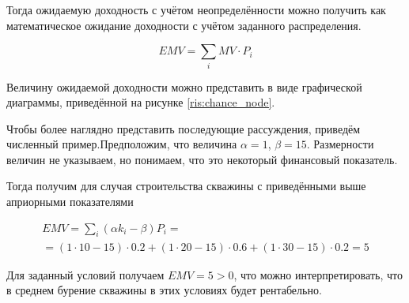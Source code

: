 Тогда ожидаемую доходность с учётом неопределённости можно получить как математическое ожидание доходности с учётом заданного распределения. 

\begin{equation}
	EMV = \sum_{i} MV \cdot P_i 
\end{equation}

Величину ожидаемой доходности можно представить в виде графической диаграммы, приведённой на рисунке \ref{ris:chance_node}.

Чтобы более наглядно представить последующие рассуждения, приведём численный пример.Предположим, что величина $\alpha = 1$, $\beta = 15$. Размерности величин не указываем, но понимаем, что это некоторый финансовый показатель.  

Тогда получим для случая строительства скважины с приведёнными выше априорными показателями 

\begin{multline}
	EMV = \sum_{i} (\alpha k_i - \beta ) P_i = \\
	= (1 \cdot 10 - 15) \cdot 0.2 + (1 \cdot 20 - 15)\cdot 0.6 + (1 \cdot 30 - 15)\cdot 0.2 = 5
\end{multline}

Для заданный условий получаем $EMV =5 > 0$, что можно интерпретировать, что в среднем бурение скважины в этих условиях будет рентабельно.


